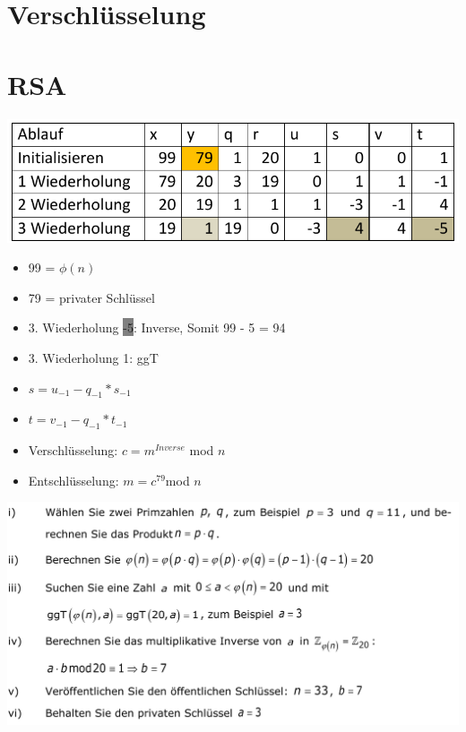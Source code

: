 
\section{Verschlüsselung}




\section{RSA}
\includegraphics[width=\linewidth]{graphic/extern-reto/RSA.png}
\begin{itemize}
    \item 99 = $\phi(n)$
    \item 79 = privater Schlüssel
    \item 3. Wiederholung \colorbox{gray}{-5}: Inverse, Somit 99 - 5 = 94
    \item 3. Wiederholung \colorbox{lightlightgrey}{1}: ggT
    \item $s = u_{-1} - q_{-1} * s_{-1}$
    \item $t = v_{-1} - q_{-1} * t_{-1}$
    \item Verschlüsselung: $c = m^{Inverse} $ mod $ n$
    \item Entschlüsselung: $m = c^{79}$mod $n$
\end{itemize}
\includegraphics[width=\linewidth]{graphic/extern-reto/RSASchritte.png}



